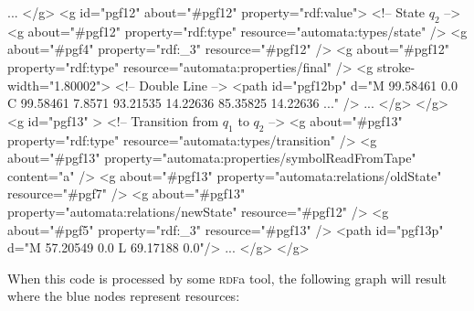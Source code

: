 \begin{codeexample}[multipage]
    ...
  </g>
  <g id="pgf12"  about="#pgf12" property="rdf:value">
    <!-- State $q_2$ -->
    <g about="#pgf12" property="rdf:type" resource="automata:types/state" />
    <g about="#pgf4" property="rdf:_3" resource="#pgf12" />
    <g about="#pgf12" property="rdf:type" resource="automata:properties/final" />
    <g stroke-width="1.80002">     <!-- Double Line -->
      <path id="pgf12bp" d="M 99.58461 0.0 C 99.58461 7.8571 93.21535 14.22636 85.35825 14.22636 ..." />
      ...
    </g>
  </g>
  <g id="pgf13" >
    <!-- Transition from $q_1$ to $q_2$ -->
    <g about="#pgf13" property="rdf:type" resource="automata:types/transition" />
    <g about="#pgf13" property="automata:properties/symbolReadFromTape" content="a" />
    <g about="#pgf13" property="automata:relations/oldState" resource="#pgf7" />
    <g about="#pgf13" property="automata:relations/newState" resource="#pgf12" />
    <g about="#pgf5" property="rdf:_3" resource="#pgf13" />
    <path id="pgf13p" d="M 57.20549 0.0 L 69.17188 0.0"/>
    ...
  </g>
</g>
\end{codeexample}

When this code is processed by some \textsc{rdf}a tool, the following graph
will result where the blue nodes represent resources:

